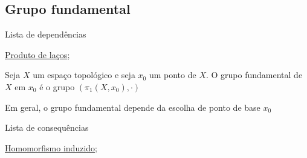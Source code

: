 \subsection{Grupo fundamental}
\label{grupo-fundamental-def}
\begin{titlemize}{Lista de dependências}
	\item \hyperref[produto-bem-definido-prop]{Produto de laços};\\ %
\end{titlemize}
\begin{defi}
	Seja $X$ um espaço topológico e seja $x_0$ um ponto de $X.$ O grupo fundamental de $X$ em $x_0$ é o grupo $(\pi_1(X,x_0),\cdot)$
\end{defi}

Em geral, o grupo fundamental depende da escolha de ponto de base $x_0$

\begin{titlemize}{Lista de consequências}
	\item \hyperref[hom-grupo-fundamental]{Homomorfismo induzido};\\ %
	\item \hyperref[]{}
\end{titlemize}
